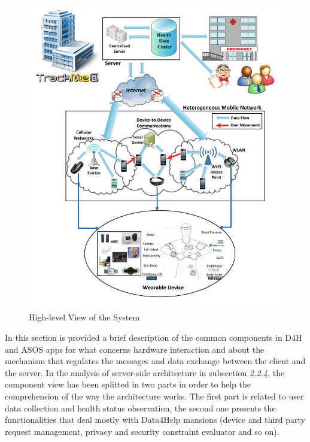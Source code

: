 \begin{flushleft}
\begin{figure}[H]
	\centering
	\includegraphics[scale=0.7]{images/system_perspective}
	\caption{High-level View of the System}
	\label{Figure 1}
\end{figure}
\newpage

{}
{\setlength{\parskip}{0.3cm}
In this section is provided a brief description of the common components in D4H and ASOS apps for what concerns hardware interaction and about the mechanism that regulates the messages and data exchange between the client and the server. In the analysis of server-side architecture in subsection \textit{2.2.4}, the component view has been splitted in two parts in order to help the comprehension of the way the architecture works. The first part is related to user data collection and health status observation, the second one presents the functionalities that deal mostly with Data4Help mansions (device and third party request management, privacy and security constraint evaluator and so on).

}
\end{flushleft}
